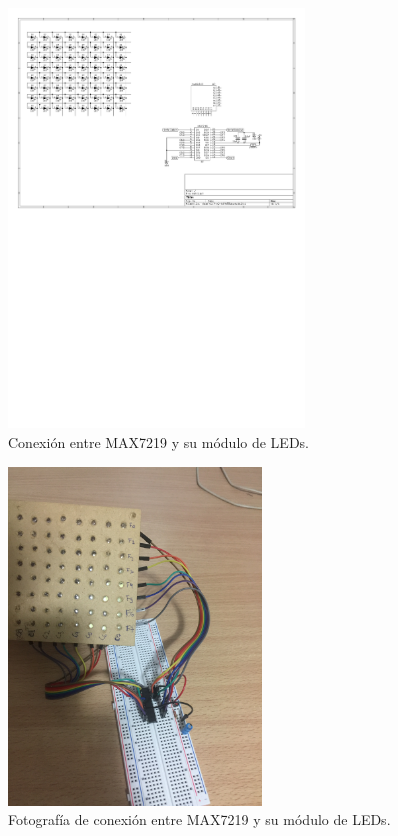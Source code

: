     \begin{figure}[ht!]
        \centering
        \begin{center}
            \includegraphics[width=0.7\textwidth]{imagenes/hw-conexiones/conexion-MAX-matriz.pdf}
            \caption{Conexión entre MAX7219 y su módulo de LEDs.}
            \label{fig:MAX-matriz}
        \end{center}
    \end{figure}
    
    \begin{figure}[ht!]
        \centering
        \begin{center}
            \includegraphics[width=0.6\textwidth]{imagenes/hw-conexiones/conexion-MAX-matriz.JPG}
            \caption{Fotografía de conexión entre MAX7219 y su módulo de LEDs.}
            \label{fig:MAX-matriz-real}
        \end{center}
    \end{figure}


